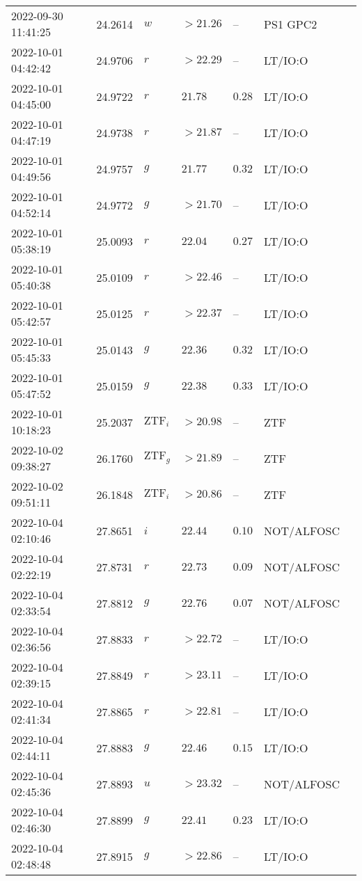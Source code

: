 \documentclass{nature_plusfigure}
\begin{document}
\begin{supplement}
\begin{center}
\begin{longtable}{lllllll}
2022-09-30 11:41:25 & 24.2614 & $w$ & $>21.26$ & -- & PS1 GPC2 &  \\ 
2022-10-01 04:42:42 & 24.9706 & $r$ & $>22.29$ & -- & LT/IO:O &  \\ 
2022-10-01 04:45:00 & 24.9722 & $r$ & $21.78$ & $0.28$ & LT/IO:O &  \\ 
2022-10-01 04:47:19 & 24.9738 & $r$ & $>21.87$ & -- & LT/IO:O &  \\ 
2022-10-01 04:49:56 & 24.9757 & $g$ & $21.77$ & $0.32$ & LT/IO:O &  \\ 
2022-10-01 04:52:14 & 24.9772 & $g$ & $>21.70$ & -- & LT/IO:O &  \\ 
2022-10-01 05:38:19 & 25.0093 & $r$ & $22.04$ & $0.27$ & LT/IO:O &  \\ 
2022-10-01 05:40:38 & 25.0109 & $r$ & $>22.46$ & -- & LT/IO:O &  \\ 
2022-10-01 05:42:57 & 25.0125 & $r$ & $>22.37$ & -- & LT/IO:O &  \\ 
2022-10-01 05:45:33 & 25.0143 & $g$ & $22.36$ & $0.32$ & LT/IO:O &  \\ 
2022-10-01 05:47:52 & 25.0159 & $g$ & $22.38$ & $0.33$ & LT/IO:O &  \\ 
2022-10-01 10:18:23 & 25.2037 & $\mathrm{ZTF}_{i}$ & $>20.98$ & -- & ZTF &  \\ 
2022-10-02 09:38:27 & 26.1760 & $\mathrm{ZTF}_{g}$ & $>21.89$ & -- & ZTF &  \\ 
2022-10-02 09:51:11 & 26.1848 & $\mathrm{ZTF}_{i}$ & $>20.86$ & -- & ZTF &  \\ 
2022-10-04 02:10:46 & 27.8651 & $i$ & $22.44$ & $0.10$ & NOT/ALFOSC &  \\ 
2022-10-04 02:22:19 & 27.8731 & $r$ & $22.73$ & $0.09$ & NOT/ALFOSC &  \\ 
2022-10-04 02:33:54 & 27.8812 & $g$ & $22.76$ & $0.07$ & NOT/ALFOSC &  \\ 
2022-10-04 02:36:56 & 27.8833 & $r$ & $>22.72$ & -- & LT/IO:O &  \\ 
2022-10-04 02:39:15 & 27.8849 & $r$ & $>23.11$ & -- & LT/IO:O &  \\ 
2022-10-04 02:41:34 & 27.8865 & $r$ & $>22.81$ & -- & LT/IO:O &  \\ 
2022-10-04 02:44:11 & 27.8883 & $g$ & $22.46$ & $0.15$ & LT/IO:O &  \\ 
2022-10-04 02:45:36 & 27.8893 & $u$ & $>23.32$ & -- & NOT/ALFOSC &  \\ 
2022-10-04 02:46:30 & 27.8899 & $g$ & $22.41$ & $0.23$ & LT/IO:O &  \\ 
2022-10-04 02:48:48 & 27.8915 & $g$ & $>22.86$ & -- & LT/IO:O &  \\ 

\end{longtable}
\end{center}
\end{supplement}
\end{document}
